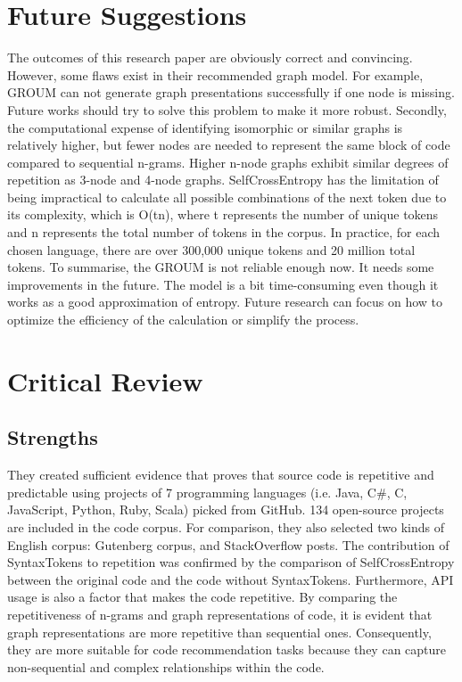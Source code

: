 \documentclass[runningheads]{llncs}
\begin{document}
\section{Future Suggestions}
The outcomes of this research paper are obviously correct and convincing. However, some flaws exist in their recommended graph model. For example, GROUM can not generate graph presentations successfully if one node is missing. Future works should try to solve this problem to make it more robust. Secondly, the computational expense of identifying isomorphic or similar graphs is relatively higher, but fewer nodes are needed to represent the same block of code compared to sequential n-grams. Higher n-node graphs exhibit similar degrees of repetition as 3-node and 4-node graphs. SelfCrossEntropy has the limitation of being impractical to calculate all possible combinations of the next token due to its complexity, which is O(tn), where t represents the number of unique tokens and n represents the total number of tokens in the corpus. In practice, for each chosen language, there are over 300,000 unique tokens and 20 million total tokens.
To summarise, the GROUM is not reliable enough now. It needs some improvements in the future. The model is a bit time-consuming even though it works as a good approximation of entropy. Future research can focus on how to optimize the efficiency of the calculation or simplify the process.

\section{Critical Review}

\subsection{Strengths}
They created sufficient evidence that proves that source code is repetitive and predictable using projects of 7 programming languages (i.e. Java, C\#, C, JavaScript, Python, Ruby, Scala) picked from GitHub. 134 open-source projects are included in the code corpus. For comparison, they also selected two kinds of English corpus: Gutenberg corpus, and StackOverflow posts. The contribution of SyntaxTokens to repetition was confirmed by the comparison of SelfCrossEntropy between the original code and the code without SyntaxTokens. Furthermore, API usage is also a factor that makes the code repetitive. By comparing the repetitiveness of n-grams and graph representations of code, it is evident that graph representations are more repetitive than sequential ones. Consequently, they are more suitable for code recommendation tasks because they can capture non-sequential and complex relationships within the code.
\end{document}
